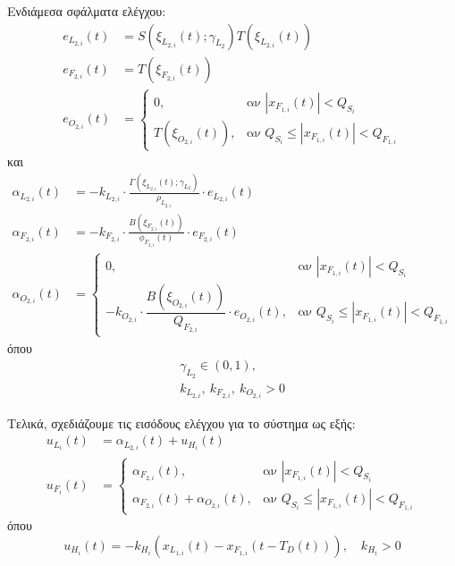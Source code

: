 \begin{step}
\bigskip
Ενδιάμεσα σφάλματα ελέγχου:
\begin{align}
  e_{L_{2,i}}(t) & = S\left( \xi_{L_{2,i}}(t); \gamma_{L_{2}} \right) T\left( \xi_{L_{2,i}}(t) \right) \label{eL2} \\[0.3cm]
  e_{F_{2,i}}(t) & = T\left( \xi_{F_{2,i}}(t) \right) \label{eF2}                                                  \\[0.3cm]
  e_{O_{2,i}}(t) & =
  \begin{cases}
    0,                                & \text{αν } | x_{F_{1,i}}(t) | < Q_{S_i}                  \\[0.3cm]
    T\left( \xi_{O_{2,i}}(t) \right), & \text{αν } Q_{S_i} \leq | x_{F_{1,i}}(t) | < Q_{F_{1,i}}
  \end{cases} \label{eO2}
\end{align}
και
\begin{align}
  \alpha_{L_{2,i}}(t) & = -k_{L_{2,i}} \cdot \frac{\Gamma\left( \xi_{L_{2,i}}(t); \gamma_{L_{2}} \right)}{\rho_{L_{2,i}}} \cdot e_{L_{2,i}}(t) \label{alphaL2} \\[0.3cm]
  \alpha_{F_{2,i}}(t) & = -k_{F_{2,i}} \cdot \frac{B\left( \xi_{F_{2,i}}(t) \right)}{\phi_{F_{2,i}}(t)} \cdot e_{F_{2,i}}(t) \label{alphaF2}                   \\[0.3cm]
  \alpha_{O_{2,i}}(t) & =
  \begin{cases}
    0,                                                                                             & \text{αν } | x_{F_{1,i}}(t) | < Q_{S_i}                  \\[0.3cm]
    - k_{O_{2,i}} \cdot \dfrac{B\left( \xi_{O_{2,i}}(t) \right)}{Q_{F_{2,i}}} \cdot e_{O_{2,i}}(t), & \text{αν } Q_{S_i} \leq | x_{F_{1,i}}(t) | < Q_{F_{1,i}}
  \end{cases} \label{alphaO2}
\end{align}
όπου
\begin{gather}
  \gamma_{L_{2}} \in (0, 1), \label{gamma2} \\
  k_{L_{2,i}},\ k_{F_{2,i}},\ k_{O_{2,i}} > 0 \label{kappa2}
\end{gather}

\bigskip
Τελικά, σχεδιάζουμε τις εισόδους ελέγχου για το σύστημα ως εξής:
\begin{align}
  u_{L_{i}}(t) & = \alpha_{L_{2,i}}(t) + u_{H_{i}}(t) \label{uL} \\[0.3cm]
  u_{F_{i}}(t) & =
  \begin{cases}
    \alpha_{F_{2,i}}(t),                       & \text{αν } | x_{F_{1,i}}(t) | < Q_{S_i}                  \\[0.3cm]
    \alpha_{F_{2,i}}(t) + \alpha_{O_{2,i}}(t), & \text{αν } Q_{S_i} \leq | x_{F_{1,i}}(t) | < Q_{F_{1,i}}
  \end{cases} \label{uF}
\end{align}
όπου
\begin{equation}
  u_{H_{i}}(t) = -k_{H_{i}} \left( x_{L_{1,i}}(t) - x_{F_{1,i}}(t - T_D(t)) \right), \quad k_{H_{i}} > 0 \label{uH}
\end{equation}
\end{step}

